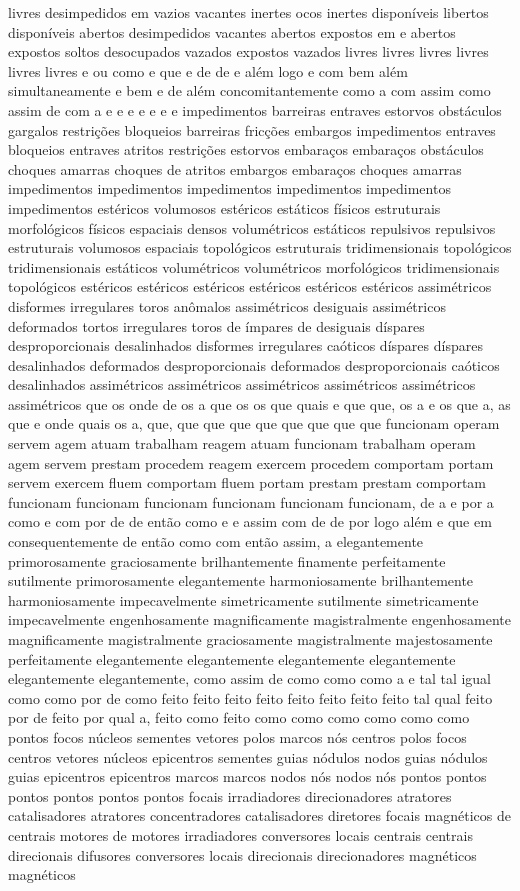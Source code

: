 livres desimpedidos em vazios vacantes inertes ocos inertes disponíveis libertos disponíveis abertos desimpedidos vacantes abertos expostos em e abertos expostos soltos desocupados vazados expostos vazados livres livres livres livres livres livres e ou como e que e de de e além logo e com bem além simultaneamente e bem e de além concomitantemente como a com assim como assim de com a e e e e e e e impedimentos barreiras entraves estorvos obstáculos gargalos restrições bloqueios barreiras fricções embargos impedimentos entraves bloqueios entraves atritos restrições estorvos embaraços embaraços obstáculos choques amarras choques de atritos embargos embaraços choques amarras impedimentos impedimentos impedimentos impedimentos impedimentos impedimentos estéricos volumosos estéricos estáticos físicos estruturais morfológicos físicos espaciais densos volumétricos estáticos repulsivos repulsivos estruturais volumosos espaciais topológicos estruturais tridimensionais topológicos tridimensionais estáticos volumétricos volumétricos morfológicos tridimensionais topológicos estéricos estéricos estéricos estéricos estéricos estéricos assimétricos disformes irregulares toros anômalos assimétricos desiguais assimétricos deformados tortos irregulares toros de ímpares de desiguais díspares desproporcionais desalinhados disformes irregulares caóticos díspares díspares desalinhados deformados desproporcionais deformados desproporcionais caóticos desalinhados assimétricos assimétricos assimétricos assimétricos assimétricos assimétricos que os onde de os a que os os que quais e que que, os a e os que a, as que e onde quais os a, que, que que que que que que que que funcionam operam servem agem atuam trabalham reagem atuam funcionam trabalham operam agem servem prestam procedem reagem exercem procedem comportam portam servem exercem fluem comportam fluem portam prestam prestam comportam funcionam funcionam funcionam funcionam funcionam funcionam, de a e por a como e com por de de então como e e assim com de de por logo além e que em consequentemente de então como com então assim, a elegantemente primorosamente graciosamente brilhantemente finamente perfeitamente sutilmente primorosamente elegantemente harmoniosamente brilhantemente harmoniosamente impecavelmente simetricamente sutilmente simetricamente impecavelmente engenhosamente magnificamente magistralmente engenhosamente magnificamente magistralmente graciosamente magistralmente majestosamente perfeitamente elegantemente elegantemente elegantemente elegantemente elegantemente elegantemente, como assim de como como como a e tal tal igual como como por de como feito feito feito feito feito feito feito feito tal qual feito por de feito por qual a, feito como feito como como como como como como pontos focos núcleos sementes vetores polos marcos nós centros polos focos centros vetores núcleos epicentros sementes guias nódulos nodos guias nódulos guias epicentros epicentros marcos marcos nodos nós nodos nós pontos pontos pontos pontos pontos pontos focais irradiadores direcionadores atratores catalisadores atratores concentradores catalisadores diretores focais magnéticos de centrais motores de motores irradiadores conversores locais centrais centrais direcionais difusores conversores locais direcionais direcionadores magnéticos magnéticos 